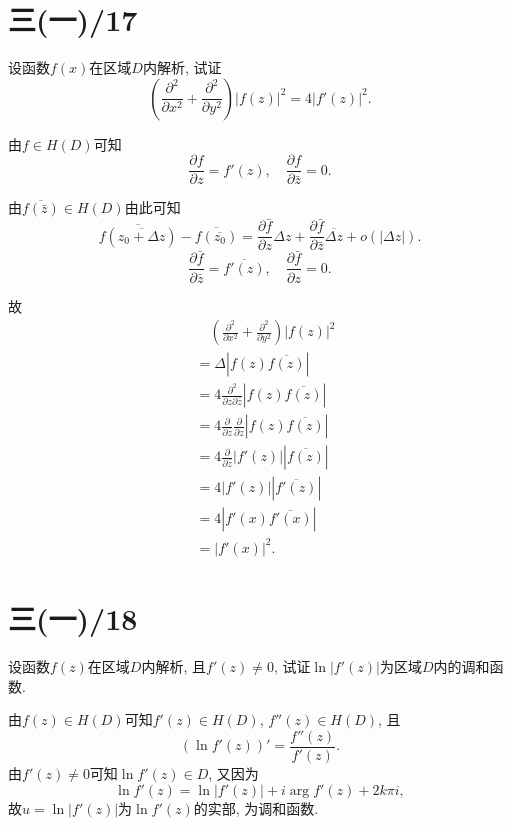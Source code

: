 \documentclass[11pt,a4paper]{article}
\begin{document}
\section{三(一)/17}
\begin{problem}
设函数$f(x)$在区域$D$内解析, 试证
$$\left(\frac{\partial^2}{\partial x^2}+\frac{\partial^2}{\partial y^2}\right)|f(z)|^2=4|f'(z)|^2.$$
\end{problem}

由$f\in H(D)$可知
$$\frac{\partial f}{\partial z}=f'(z),\quad \frac{\partial f}{\partial\bar{z}}=0.$$

由$\overline{f(\bar{z})}\in H(D)$由此可知
$$\overline{f(\overline{z_0+\Delta z})}-\overline{f(\overline{z_0})}=\frac{\partial\bar{f}}{\partial z}\Delta z+ \frac{\partial\bar{f}}{\partial\bar{z}}\overline{\Delta z}+o(|\Delta z|).$$
$$\frac{\partial\bar{f}}{\partial\bar{z}}=\overline{f'(z)},\quad\frac{\partial\bar{f}}{\partial z}=0.$$

故
\begin{align*}
   & \quad \left(\frac{\partial^2}{\partial x^2}+\frac{\partial^2}{\partial y^2}\right)|f(z)|^2 \\
   & = \Delta|f(z)\overline{f(z)}|                                                              \\
   & =4\frac{\partial^2}{\partial z\partial\bar{z}}|f(z)\overline{f(z)}|                        \\
   & =4\frac{\partial}{\partial\bar{z}}\frac{\partial}{\partial z}|f(z)\overline{f(z)}|         \\
   & = 4\frac{\partial}{\partial\bar{z}}|f'(z)||\overline{f(z)}|                                \\
   & = 4|f'(z)||\overline{f'(z)}|                                                               \\
   & =4|f'(x)\overline{f'(x)}|                                                                  \\
   & = |f'(x)|^2.
\end{align*}

\section{三(一)/18}
\begin{problem}
设函数$f(z)$在区域$D$内解析, 且$f'(z)\neq 0$, 试证$\ln|f'(z)|$为区域$D$内的调和函数.
\end{problem}

由$f(z)\in H(D)$可知$f'(z)\in H(D)$, $f''(z)\in H(D)$, 且
$$(\ln f'(z))'=\frac{f''(z)}{f'(z)}.$$
由$f'(z)\neq 0$可知$\ln f'(z)\in D$, 又因为
$$\ln f'(z)=\ln|f'(z)|+i\arg f'(z)+2k\pi i,$$
故$u=\ln|f'(z)|$为$\ln f'(z)$的实部, 为调和函数.
\end{document}
